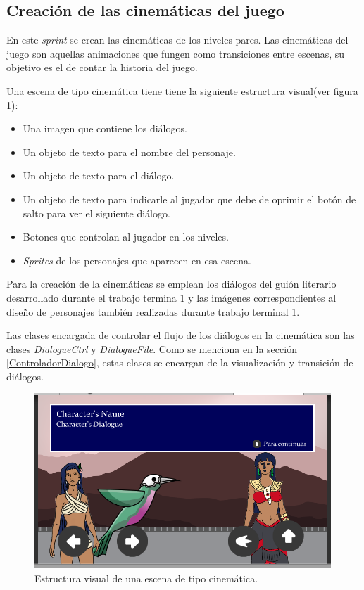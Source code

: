 \subsection{Creación de las cinemáticas del juego}
En este \textit{sprint} se crean las cinemáticas de los niveles pares. Las
cinemáticas del juego son aquellas animaciones que fungen como transiciones
entre escenas, su objetivo es el de contar la historia del juego.
\\
\par
Una escena de tipo cinemática tiene tiene la siguiente estructura visual(ver
figura \ref{fig:Cinematica}):
    \begin{itemize}
        \item Una imagen que contiene  los diálogos.
        \item Un objeto de texto para el nombre del personaje.
        \item Un objeto de texto para el diálogo.
        \item Un objeto de texto para indicarle al jugador que debe de oprimir el
        botón de salto para ver el siguiente diálogo.
        \item Botones que controlan al jugador en los niveles.
        \item \textit{Sprites} de los personajes que aparecen en esa escena.
    \end{itemize}
Para la creación de la cinemáticas se emplean los diálogos del guión literario
desarrollado durante el trabajo termina 1 y las imágenes correspondientes al
diseño de personajes también realizadas durante trabajo terminal 1.
\\
\par
Las clases encargada de controlar el flujo de los diálogos en la cinemática
son las clases \textit{DialogueCtrl} y \textit{DialogueFile}. Como se menciona
en la sección \ref{ControladorDialogo}, estas clases se encargan de la
visualización y transición de diálogos.

\begin{figure}[h]
        \centering
        \includegraphics[height=0.3 \textheight]{03TrabajoRealizado/imagenes/cutscene.png}
        \caption{Estructura visual de una escena de tipo cinemática.}
        \label{fig:Cinematica}
\end{figure}

